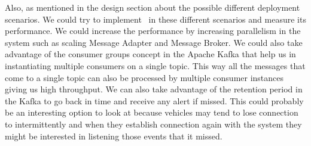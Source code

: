 Also, as mentioned in the design section about the possible different
deployment scenarios. We could try to implement \name~in these
different scenarios and measure its performance. We could increase the
performance by increasing parallelism in the system such as scaling
Message Adapter and Message Broker. We could also take advantage of
the consumer groups concept in the Apache Kafka that help us in
instantiating multiple consumers on a single topic. This way all the
messages that come to a single topic can also be processed by multiple
consumer instances giving us high throughput. We can also take
advantage of the retention period in the Kafka to go back in time and
receive any alert if missed. This could probably be an interesting
option to look at because vehicles may tend to lose connection to
intermittently and when they establish connection again with the
system they might be interested in listening those events that it
missed.

